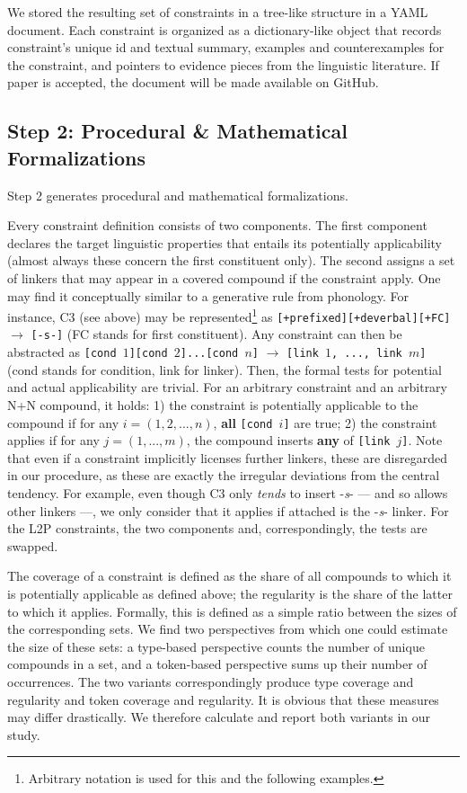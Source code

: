 \documentclass[10pt, a4paper]{article}
\begin{document}
We stored the resulting set of constraints in a tree-like structure in a YAML document. Each constraint is organized as a dictionary-like object that records constraint's unique id and textual summary, examples and counterexamples for the constraint, and pointers to evidence pieces from the linguistic literature. If paper is accepted, the document will be made available on GitHub.




\subsection{Step 2: Procedural \& Mathematical Formalizations}
\label{sec:formal}

Step 2 generates procedural and mathematical formalizations.

Every constraint definition consists of two components. The first component declares the target linguistic properties that entails its potentially applicability (almost always these concern the first constituent only). The second assigns a set of linkers that may appear in a covered compound if the constraint apply. One may find it conceptually similar to a generative rule from phonology. For instance, C3 (see above) may be represented\footnote{Arbitrary notation is used for this and the following examples.} as \mbox{\texttt{[+prefixed][+deverbal][+FC]}} $\rightarrow$ \mbox{\texttt{[-s-]}} (FC stands for first constituent). Any constraint can then be abstracted as \mbox{\texttt{[cond $1$][cond $2$]...[cond $n$]}} $\rightarrow$ \mbox{\texttt{[link $1$, ..., link $m$]}} (cond stands for condition, link for linker). Then, the formal tests for potential and actual applicability are trivial. For an arbitrary constraint and an arbitrary N+N compound, it holds: 1) the constraint is potentially applicable to the compound if for any \mbox{$i = (1, 2, ..., n)$}, \textbf{all} \mbox{\texttt{[cond $i$]}} are true; 2) the constraint applies if for any \mbox{$j = (1, ..., m)$}, the compound inserts \textbf{any} of \mbox{\texttt{[link $j$]}}. Note that even if a constraint implicitly licenses further linkers, these are disregarded in our procedure, as these are exactly the irregular deviations from the central tendency. For example, even though C3 only \textit{tends} to insert -\textit{s}- --- and so allows other linkers ---, we only consider that it applies if attached is the -\textit{s}- linker. For the L2P constraints, the two components and, correspondingly, the tests are swapped.

The coverage of a constraint is defined as the share of all compounds to which it is potentially applicable as defined above; the regularity is the share of the latter to which it applies. Formally, this is defined as a simple ratio between the sizes of the corresponding sets. We find two perspectives from which one could estimate the size of these sets: a type-based perspective counts the number of unique compounds in a set, and a token-based perspective sums up their number of occurrences. The two variants correspondingly produce type coverage and regularity and token coverage and regularity. It is obvious that these measures may differ drastically. We therefore calculate and report both variants in our study.
\end{document}
